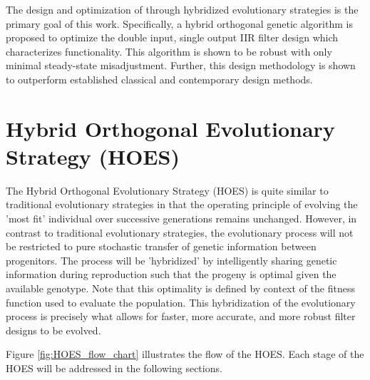 %
%

The design and optimization of \DSms through hybridized evolutionary strategies is the
primary goal of this work. Specifically, a hybrid orthogonal genetic algorithm is proposed
to optimize the double input, single output IIR filter design which characterizes \DSm
functionality. This algorithm is shown to be robust with only minimal steady-state
misadjustment. Further, this design methodology is shown to outperform established
classical and contemporary design methods.

\section{Hybrid Orthogonal Evolutionary Strategy (HOES)}
The Hybrid Orthogonal Evolutionary Strategy (HOES) is quite similar to traditional
evolutionary strategies in that the operating principle of evolving the 'most fit'
individual over successive generations remains unchanged. However, in contrast to
traditional evolutionary strategies, the evolutionary process will not be restricted to
pure stochastic transfer of genetic information between progenitors. The process will be
'hybridized' by intelligently sharing genetic information during reproduction such that
the progeny is optimal given the available genotype. Note that this optimality is defined
by context of the fitness function used to evaluate the population. This hybridization of
the evolutionary process is precisely what allows for faster, more accurate, and more
robust filter designs to be evolved.

Figure \ref{fig:HOES_flow_chart} illustrates the flow of the HOES. Each stage of the HOES
will be addressed in the following sections.

